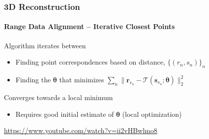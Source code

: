 \documentclass[xetex,professionalfont]{beamer}
\renewcommand{\vec}[1]{\ensuremath{\mathbf{#1}}}
\newcommand{\vr}{\vec{r}}
\newcommand{\vs}{\vec{s}}
\newcommand{\bth}{\boldsymbol{\theta}}
\newcommand{\trans}{\mathcal{T}}
\begin{document}

\begin{frame}
\frametitle{3D Reconstruction}
\framesubtitle{Range Data Alignment -- Iterative Closest Points}

Algorithm iterates between
\begin{itemize}
	\item Finding point correspondences based on distance, $\{(r_n,s_n)\}_n$ %
	\item Finding the $\bth$ that minimizes $\sum_n\lVert\vr_{r_n}-\trans(\vs_{s_n};\bth) \rVert_2^2$ %
\end{itemize}

\bigskip
Converges towards a local minimum
\begin{itemize}
	\item Requires good initial estimate of $\bth$ (local optimization) %
\end{itemize}

\bigskip
\begin{center}
	\url{https://www.youtube.com/watch?v=ii2vHBwlmo8}
\end{center}


\end{frame}

\end{document}
